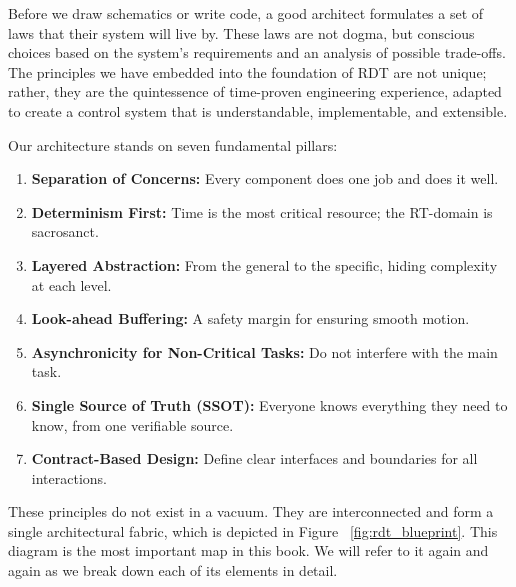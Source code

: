 Before we draw schematics or write code, a good architect formulates a set of laws that their system will live by. These laws are not dogma, but conscious choices based on the system's requirements and an analysis of possible trade-offs. The principles we have embedded into the foundation of RDT are not unique; rather, they are the quintessence of time-proven engineering experience, adapted to create a control system that is understandable, implementable, and extensible.

Our architecture stands on seven fundamental pillars:

\begin{enumerate}
    \item \textbf{Separation of Concerns:} Every component does one job and does it well.
    \item \textbf{Determinism First:} Time is the most critical resource; the RT-domain is sacrosanct.
    \item \textbf{Layered Abstraction:} From the general to the specific, hiding complexity at each level.
    \item \textbf{Look-ahead Buffering:} A safety margin for ensuring smooth motion.
    \item \textbf{Asynchronicity for Non-Critical Tasks:} Do not interfere with the main task.
    \item \textbf{Single Source of Truth (SSOT):} Everyone knows everything they need to know, from one verifiable source.
    \item \textbf{Contract-Based Design:} Define clear interfaces and boundaries for all interactions.
\end{enumerate}

These principles do not exist in a vacuum. They are interconnected and form a single architectural fabric, which is depicted in Figure ~\ref{fig:rdt_blueprint}. This diagram is the most important map in this book. We will refer to it again and again as we break down each of its elements in detail.


